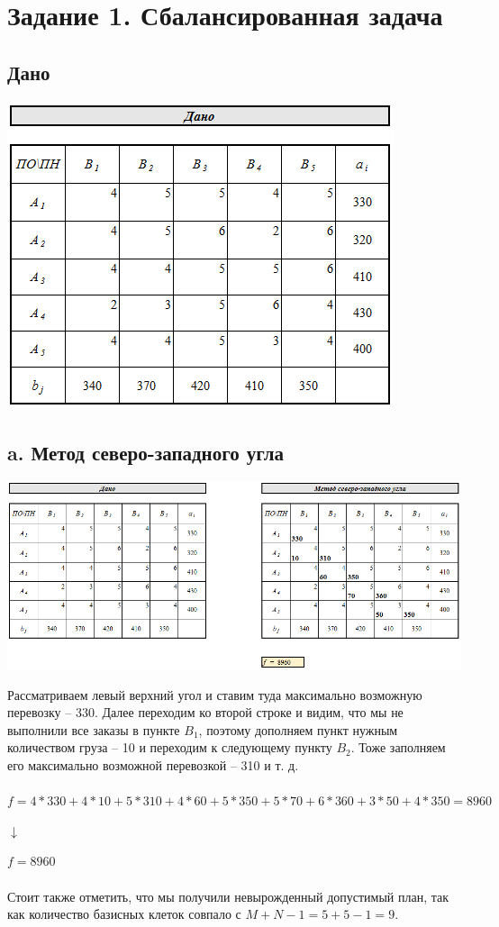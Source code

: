 \documentclass[14pt,a4paper,fleqn]{extarticle}
\begin{document}
\section*{Задание 1. Сбалансированная задача}
\subsection*{Дано}
\begin{center}
	\includegraphics[scale=0.75]{1}
\end{center}
\newpage
\subsection*{a. Метод северо-западного угла}
\begin{center}
	\includegraphics[scale=0.51]{2}
\end{center}
\small Рассматриваем левый верхний угол и ставим туда максимально возможную перевозку -- 330. Далее переходим ко второй строке и видим, что мы не выполнили все заказы в пункте $B_1$, поэтому дополняем пункт нужным количеством груза -- 10 и переходим к следующему пункту $B_2$. Тоже заполняем его максимально возможной перевозкой -- 310 и т. д.\\\\
\small $f = 4*330+4*10+5*310+4*60+5*350+5*70+6*360+3*50+4*350 = 8960$
\begin{center}
$\downarrow$
\end{center}
$f = 8960$\\\\
Стоит также отметить, что мы получили невырожденный допустимый план, так как количество базисных клеток совпало с $M+N-1 = 5+5-1 = 9$.
\newpage
\end{document}
